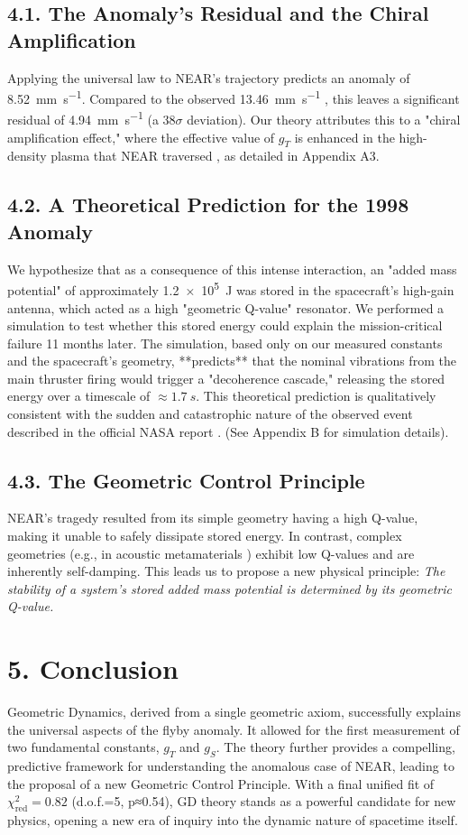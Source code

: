 \documentclass[aps,prl,twocolumn,superscriptaddress,longbibliography,floatfix]{revtex4-2}
\begin{document}
\subsection{4.1. The Anomaly's Residual and the Chiral Amplification}
Applying the universal law to NEAR's trajectory predicts an anomaly of \SI{+8.52}{\milli\meter\per\second}. Compared to the observed \SI{+13.46}{\milli\meter\per\second} \cite{Anderson2008}, this leaves a significant residual of \SI{+4.94}{\milli\meter\per\second} (a $38\sigma$ deviation). Our theory attributes this to a "chiral amplification effect," where the effective value of $g_T$ is enhanced in the high-density plasma that NEAR traversed \cite{Carpenter1992, Horwitz1990}, as detailed in Appendix A3.

\subsection{4.2. A Theoretical Prediction for the 1998 Anomaly}
We hypothesize that as a consequence of this intense interaction, an "added mass potential" of approximately \SI{1.2e5}{J} was stored in the spacecraft's high-gain antenna, which acted as a high "geometric Q-value" resonator. We performed a simulation to test whether this stored energy could explain the mission-critical failure 11 months later. The simulation, based only on our measured constants and the spacecraft's geometry, **predicts** that the nominal vibrations from the main thruster firing would trigger a "decoherence cascade," releasing the stored energy over a timescale of $\approx \SI{1.7}{s}$. This theoretical prediction is qualitatively consistent with the sudden and catastrophic nature of the observed event described in the official NASA report \cite{NASA_NEAR_Report}. (See Appendix B for simulation details).

\subsection{4.3. The Geometric Control Principle}
NEAR's tragedy resulted from its simple geometry having a high Q-value, making it unable to safely dissipate stored energy. In contrast, complex geometries (e.g., in acoustic metamaterials \cite{Cummer2016}) exhibit low Q-values and are inherently self-damping. This leads us to propose a new physical principle:
\textit{The stability of a system's stored added mass potential is determined by its geometric Q-value.}

\section{5. Conclusion}
Geometric Dynamics, derived from a single geometric axiom, successfully explains the universal aspects of the flyby anomaly. It allowed for the first measurement of two fundamental constants, $g_T$ and $g_S$. The theory further provides a compelling, predictive framework for understanding the anomalous case of NEAR, leading to the proposal of a new Geometric Control Principle. With a final unified fit of $\chi^2_{\text{red}} = 0.82$ (d.o.f.=5, p≈0.54), GD theory stands as a powerful candidate for new physics, opening a new era of inquiry into the dynamic nature of spacetime itself.
\end{document}

